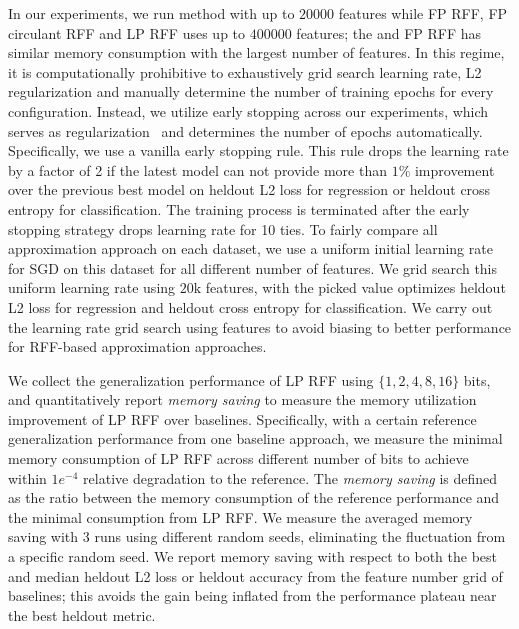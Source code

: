 In our experiments, we run \Nystrom method with up to $20000$ features while FP RFF, FP circulant RFF and LP RFF uses up to $400000$ features; the \Nystrom and FP RFF has similar memory consumption with the largest number of features. In this regime, it is computationally prohibitive to exhaustively grid search learning rate, L2 regularization and manually determine the number of training epochs for every configuration. Instead, we utilize early stopping across our experiments, which serves as regularization~\cite{wei2017early, zhang2005boosting} and determines the number of epochs automatically. Specifically, we use a vanilla early stopping rule. This rule drops the learning rate by a factor of 2 if the latest model can not provide more than $1\%$ improvement over the previous best model on heldout L2 loss for regression or heldout cross entropy for classification. The training process is terminated after the early stopping strategy drops learning rate for 10 ties. To fairly compare all approximation approach on each dataset, we use a uniform initial learning rate for SGD on this dataset for all different number of features. We grid search this uniform learning rate using $20\text{k}$ \Nystrom features, with the picked value optimizes heldout L2 loss for regression and heldout cross entropy for classification. We carry out the learning rate grid search using \Nystrom features to avoid biasing to better performance for RFF-based approximation approaches. 

We collect the generalization performance of LP RFF using $\{1,2,4,8,16\}$ bits, and quantitatively report \emph{memory saving} to measure the memory utilization improvement of LP RFF over baselines. Specifically, with a certain reference generalization performance from one baseline approach, we measure the minimal memory consumption of LP RFF across different number of bits to achieve within $1e^{-4}$ relative degradation to the reference. The \emph{memory saving} is defined as the ratio between the memory consumption of the reference performance and the minimal consumption from LP RFF. We measure the averaged memory saving with 3 runs using different random seeds, eliminating the fluctuation from a specific random seed. We report memory saving with respect to both the best and median heldout L2 loss or heldout accuracy from the feature number grid of baselines; this avoids the gain being inflated from the performance plateau near the best heldout metric.

